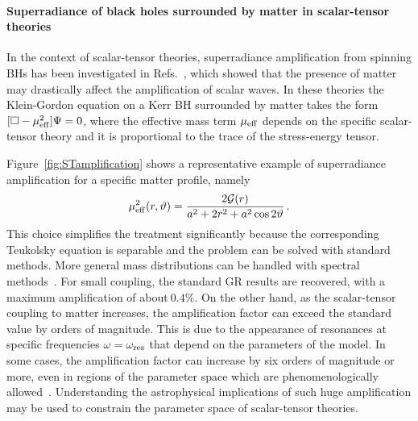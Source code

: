 \documentclass[11pt]{article}
\numberwithin{equation}{section} %
\begin{document}
\paragraph{Superradiance of black holes surrounded by matter in scalar-tensor theories\label{sec:super_ST}}
In the context of scalar-tensor theories, superradiance amplification from spinning BHs has been investigated in Refs.~\cite{Cardoso:2013fwa,Cardoso:2013opa,Dima:2020rzg}, which showed that the presence of matter may drastically affect the amplification of scalar waves. In these theories the Klein-Gordon equation on a Kerr BH surrounded by matter takes the form $[\square-\mu_{\rm eff}^2]\Psi=0$, where the effective mass term $\mu_{\rm eff}$ depends on the specific scalar-tensor theory and it is proportional to the trace of the stress-energy tensor. 

Figure~\ref{fig:STamplification} shows a representative example of superradiance amplification for a specific matter profile, namely
%
\begin{equation}
\mu_{\rm eff}^2(r,\vartheta)=\frac{2{\cal G}(r)}{a^2+2r^2+a^2\cos2\vartheta}\,.\label{separable}
\end{equation}
%
This choice simplifies the treatment significantly because the corresponding Teukolsky equation is separable and the problem can be solved with standard methods. More general mass distributions can be handled with spectral methods~\cite{Dima:2020rzg}.
For small coupling, the standard GR results are recovered, with a maximum amplification of about$~0.4\%$. On the other hand, as the scalar-tensor coupling to matter increases, the amplification factor can exceed the standard value by orders of magnitude. This is due to the appearance of resonances at specific frequencies $\omega=\omega_{\rm res}$ that depend on the parameters of the model. In some cases, the amplification factor can increase by six orders of magnitude or more, even in regions of the parameter space which are phenomenologically allowed~\cite{Cardoso:2013opa}. Understanding the astrophysical implications of such huge amplification may be used to constrain the parameter space of scalar-tensor theories. 
\end{document}
